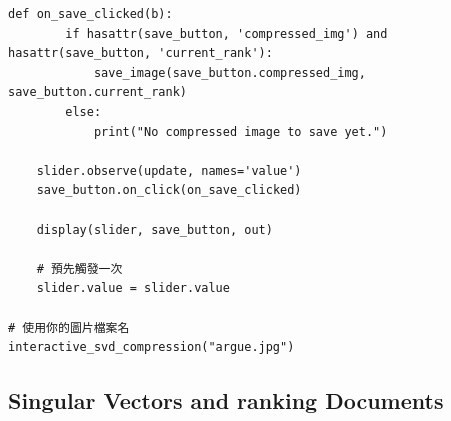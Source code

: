 \begin{lstlisting}[language=iPython, caption={Source Code of SVD Compression}]
    def on_save_clicked(b):
        if hasattr(save_button, 'compressed_img') and hasattr(save_button, 'current_rank'):
            save_image(save_button.compressed_img, save_button.current_rank)
        else:
            print("No compressed image to save yet.")

    slider.observe(update, names='value')
    save_button.on_click(on_save_clicked)

    display(slider, save_button, out)

    # 預先觸發一次
    slider.value = slider.value

# 使用你的圖片檔案名
interactive_svd_compression("argue.jpg")
\end{lstlisting}

\subsection{Singular Vectors and ranking Documents}

